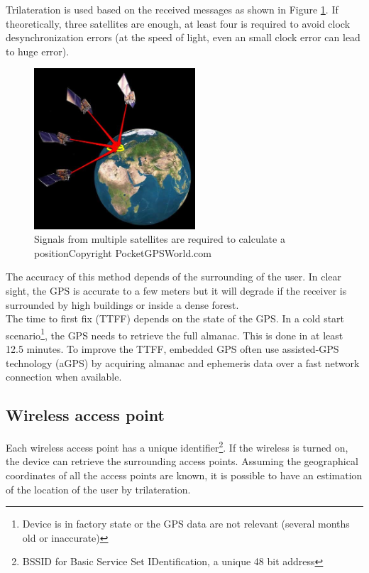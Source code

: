 Trilateration is used based on the received messages as shown in Figure \ref{fig:gps-earth}.
If theoretically, three satellites are enough, at least four is required to avoid clock desynchronization errors (at the speed of light, even an small clock error can lead to huge error).\\

\begin{figure}[h]
  \centering
  \includegraphics[width=6cm]{images/gps.jpg}
  \caption{Signals from multiple satellites are required to calculate a position\newline Copyright PocketGPSWorld.com}
  \label{fig:gps-earth}
\end{figure}


The accuracy of this method depends of the surrounding of the user.
In clear sight, the GPS is accurate to a few meters but it will degrade if the receiver is surrounded by high buildings or inside a dense forest.\\

The time to first fix (TTFF) depends on the state of the GPS.
In a cold start scenario\footnote{Device is in factory state or the GPS data are not relevant (several months old or inaccurate)}, the GPS needs to retrieve the full almanac.
This is done in at least 12.5 minutes\cite{gpsuser}.
To improve the TTFF, embedded GPS often use assisted-GPS technology (aGPS) by acquiring almanac and ephemeris data over a fast network connection when available.

\subsection{Wireless access point}
Each wireless access point has a unique identifier\footnote{BSSID for Basic Service Set IDentification, a unique 48 bit address}.
If the wireless is turned on, the device can retrieve the surrounding access points.
Assuming the geographical coordinates of all the access points are known, it is possible to have an estimation of the location of the user by trilateration.\\

